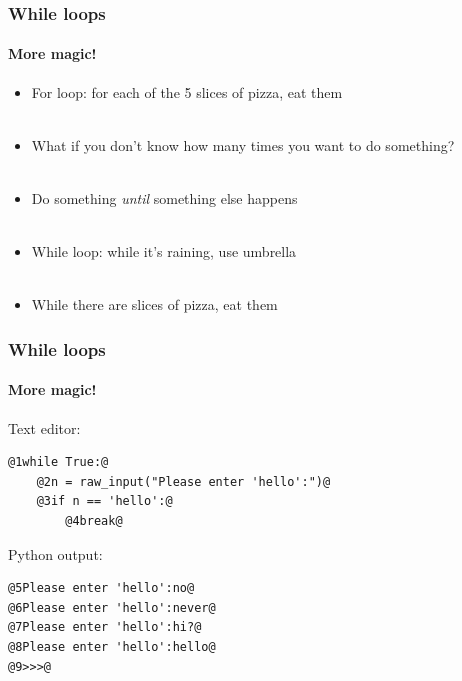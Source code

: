 \documentclass[handout]{beamer}
\begin{document}
\begin{frame}[fragile]
\frametitle{While loops}
\framesubtitle{More magic!}
\large


\begin{itemize}

\item<1->{For loop: for each of the 5 slices of pizza, eat them} \\ \

 \item<2-> What if you don't know how many times you want to do something? \\ \

\item<3->{Do something \emph{until} something else happens} \\ \



\item<4->{While loop: while it's raining, use umbrella}\\ \

\item<5-> While there are slices of pizza, eat them





\end{itemize}
\end{frame}

\begin{frame}[fragile]
\frametitle{While loops}
\framesubtitle{More magic!}

     
         Text editor:
\begin{lstlisting}[style=base]
@1while True:@
    @2n = raw_input("Please enter 'hello':")@
    @3if n == 'hello':@
        @4break@

\end{lstlisting}

\vfill

Python output:
\begin{lstlisting}[style=base]
@5Please enter 'hello':no@
@6Please enter 'hello':never@
@7Please enter 'hello':hi?@
@8Please enter 'hello':hello@
@9>>>@


\end{lstlisting}


\end{frame}
\end{document}
